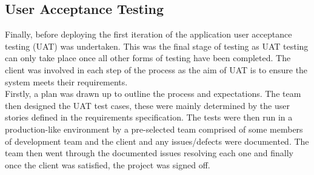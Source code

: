\documentclass[11pt, english]{article}
\begin{document}
	\subsection{User Acceptance Testing}

	Finally, before deploying the first iteration of the application user acceptance testing (UAT) was undertaken. This was the final stage of testing as UAT testing can only take place once all other forms of testing have been completed. The client was involved in each step of the process as the aim of UAT is to ensure the system meets their requirements.\\

	Firstly, a plan was drawn up to outline the process and expectations. The team then designed the UAT test cases, these were mainly determined by the user stories defined in the requirements specification. The tests were then run in a production-like environment by a pre-selected team comprised of some members of development team and the client and any issues/defects were documented. The team then went through the documented issues resolving each one and finally once the client was satisfied, the project was signed off.
\end{document}
